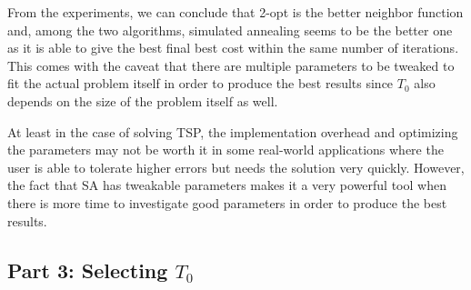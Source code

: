 From the experiments, we can conclude that 2-opt is the better neighbor function and, among the two algorithms, simulated annealing seems to be the better one as it is able to give the best final best cost within the same number of iterations. This comes with the caveat that there are multiple parameters to be tweaked to fit the actual problem itself in order to produce the best results since \(T_0\) also depends on the size of the problem itself as well.

At least in the case of solving TSP, the implementation overhead and optimizing the parameters may not be worth it in some real-world applications where the user is able to tolerate higher errors but needs the solution very quickly. However, the fact that SA has tweakable parameters makes it a very powerful tool when there is more time to investigate good parameters in order to produce the best results.

\subsection*{Part 3: Selecting \(T_0\)}

